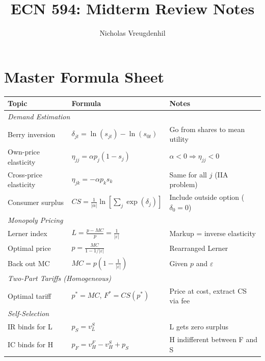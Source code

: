\documentclass[11pt]{article}
\title{ECN 594: Midterm Review Notes}
\author{Nicholas Vreugdenhil}
\date{}
\begin{document}
\maketitle

\section{Master Formula Sheet}

\begin{center}
\begin{tabular}{lll}
	\toprule
	\textbf{Topic} & \textbf{Formula} & \textbf{Notes} \\
	\midrule
	\multicolumn{3}{l}{\textit{Demand Estimation}} \\
	Berry inversion & $\delta_{jt} = \ln(s_{jt}) - \ln(s_{0t})$ & Go from shares to mean utility \\
	Own-price elasticity & $\eta_{jj} = \alpha p_{j} (1 - s_{j})$ & $\alpha < 0 \Rightarrow \eta_{jj} < 0$ \\
	Cross-price elasticity & $\eta_{jk} = -\alpha p_{k} s_{k}$ & Same for all $j$ (IIA problem) \\
	Consumer surplus & $CS = \frac{1}{|\alpha|} \ln\left[\sum_j \exp(\delta_{j})\right]$ & Include outside option ($\delta_0 = 0$) \\
	\midrule
	\multicolumn{3}{l}{\textit{Monopoly Pricing}} \\
	Lerner index & $L = \frac{p - MC}{p} = \frac{1}{|\varepsilon|}$ & Markup = inverse elasticity \\
	Optimal price & $p = \frac{MC}{1 - 1/|\varepsilon|}$ & Rearranged Lerner \\
	Back out MC & $MC = p\left(1 - \frac{1}{|\varepsilon|}\right)$ & Given $p$ and $\varepsilon$ \\
	\midrule
	\multicolumn{3}{l}{\textit{Two-Part Tariffs (Homogeneous)}} \\
	Optimal tariff & $p^* = MC$, \quad $F^* = CS(p^*)$ & Price at cost, extract CS via fee \\
	\midrule
	\multicolumn{3}{l}{\textit{Self-Selection}} \\
	IR binds for L & $p_S = v_L^S$ & L gets zero surplus \\
	IC binds for H & $p_F = v_H^F - v_H^S + p_S$ & H indifferent between F and S \\
	\bottomrule
\end{tabular}
\end{center}
\end{document}
